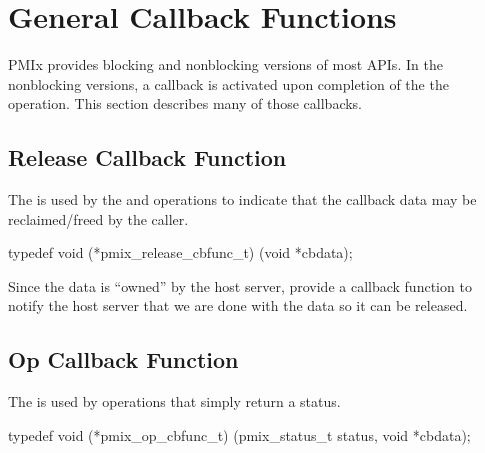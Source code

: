 \section{General Callback Functions}

PMIx provides blocking and nonblocking versions of most APIs.
In the nonblocking versions, a callback is activated upon completion of the the operation.
This section describes many of those callbacks.

\subsection{Release Callback Function}

\summary

The  is used by the  and  operations to indicate that the callback data may be reclaimed/freed by the caller.

\format

\cspecificstart
\begin{codepar}
typedef void (*pmix_release_cbfunc_t)
    (void *cbdata);
\end{codepar}
\cspecificend

\begin{arglist}
\end{arglist}

\descr

Since the data is ``owned'' by the host server, provide a callback function to notify the host server that we are done with the data so it can be released.


\subsection{Op Callback Function}

\summary

The  is used by operations that simply return a status.

\cspecificstart
\begin{codepar}
typedef void (*pmix_op_cbfunc_t)
    (pmix_status_t status, void *cbdata);
\end{codepar}
\cspecificend

